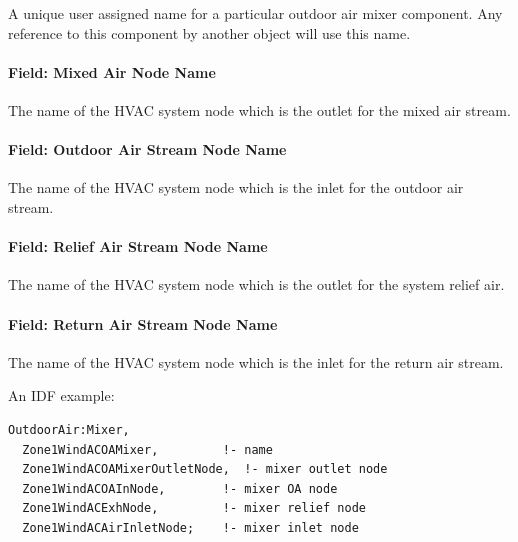 A unique user assigned name for a particular outdoor air mixer component. Any reference to this component by another object will use this name.

\paragraph{Field: Mixed Air Node Name}\label{field-mixed-air-node-name}

The name of the HVAC system node which is the outlet for the mixed air stream.

\paragraph{Field: Outdoor Air Stream Node Name}\label{field-outdoor-air-stream-node-name}

The name of the HVAC system node which is the inlet for the outdoor air stream.

\paragraph{Field: Relief Air Stream Node Name}\label{field-relief-air-stream-node-name}

The name of the HVAC system node which is the outlet for the system relief air.

\paragraph{Field: Return Air Stream Node Name}\label{field-return-air-stream-node-name}

The name of the HVAC system node which is the inlet for the return air stream.

An IDF example:

\begin{lstlisting}
OutdoorAir:Mixer,
  Zone1WindACOAMixer,         !- name
  Zone1WindACOAMixerOutletNode,  !- mixer outlet node
  Zone1WindACOAInNode,        !- mixer OA node
  Zone1WindACExhNode,         !- mixer relief node
  Zone1WindACAirInletNode;    !- mixer inlet node
\end{lstlisting}

